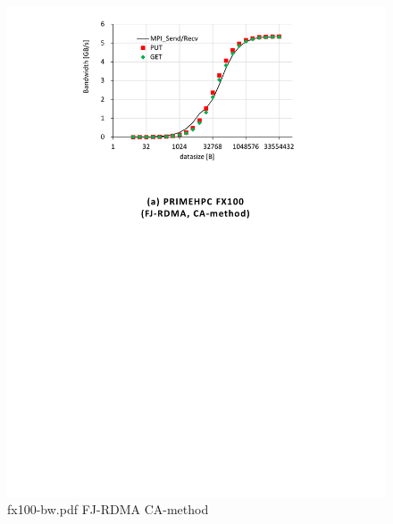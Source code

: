 \begin{figure}
  \begin{center}
    \mbox{\includegraphics[trim=41mm 190mm 49mm 3mm, scale=0.7,clip]{figs/fx100-bw.pdf}}
    \caption{fx100-bw.pdf FJ-RDMA CA-method}\label{fig:fx100-bw}
  \end{center}
  \begin{center}

\end{center}
\end{figure}

